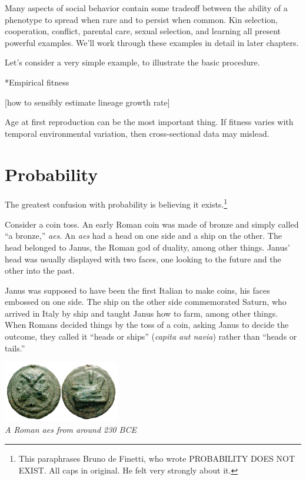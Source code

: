 \documentclass[10pt,reqno]{amsbook}
\makeatletter
\renewcommand\section{\@startsection{section}{1}
\z@{.7\linespacing\@plus\linespacing}{.5\linespacing}
{\large\bfseries\itshape}}
\numberwithin{equation}{chapter}
\makeatother
\begin{document}
Many aspects of social behavior contain some tradeoff between the ability of a phenotype to spread when rare and to persist when common. Kin selection, cooperation, conflict, parental care, sexual selection, and learning all present powerful examples. We'll work through these examples in detail in later chapters. 

Let's consider a very simple example, to illustrate the basic procedure. 


\section*{Empirical fitness}

[how to sensibly estimate lineage growth rate]

Age at first reproduction can be the most important thing. If fitness varies with temporal environmental variation, then cross-sectional data may mislead.



\def \chapterElement {P}
\chapter{Probability}\label{link2P}

The greatest confusion with probability is believing it exists.\footnote{This paraphrases Bruno de Finetti, who wrote PROBABILITY DOES NOT EXIST. All caps in original. He felt very strongly about it.}

Consider a coin toss. 
An early Roman coin was made of bronze and simply called ``a bronze,'' \emph{aes}. An \emph{aes} had a head on one side and a ship on the other. The head belonged to Janus, the Roman god of duality, among other things. Janus' head was usually displayed with two faces, one looking to the future and the other into the past. 

Janus was supposed to have been the first Italian to make coins, his faces embossed on one side. The ship on the other side commemorated Saturn, who arrived in Italy by ship and taught Janus how to farm, among other things. When Romans decided things by the toss of a coin, asking Janus to decide the outcome, they called it ``heads or ships'' (\emph{capita aut navia}) rather than ``heads or tails.''

\vspace{1em}
\begin{center}
	\includegraphics[width=2in]{01_01_aes.png}\\
	\emph{A Roman \emph{aes} from around 230 BCE}
\end{center}
\vspace{1em}
\end{document}
